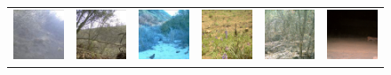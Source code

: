 \begin{figure}[htp!]
\begin{tabularx}{.8\textwidth}{Y Y Y !{\hspace{.05\textwidth}} Y Y Y}
        \includegraphics{gfx/unconditional-diffusion-sampling-caltech-qual/rgb_585dab96-23d2-11e8-a6a3-ec086b02610b.jpg} & \includegraphics{gfx/unconditional-diffusion-sampling-caltech-qual/rgb_585f4d99-23d2-11e8-a6a3-ec086b02610b.jpg} & \includegraphics{gfx/unconditional-diffusion-sampling-caltech-qual/rgb_585f4fbd-23d2-11e8-a6a3-ec086b02610b.jpg} & \includegraphics{gfx/unconditional-diffusion-sampling-caltech-qual/diffusion_00005.png} & \includegraphics{gfx/unconditional-diffusion-sampling-caltech-qual/diffusion_00004.png} & \includegraphics{gfx/unconditional-diffusion-sampling-caltech-qual/diffusion_00003.png} \\

\end{tabularx}
\end{figure}

